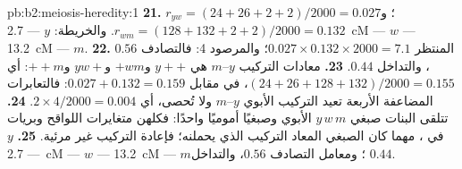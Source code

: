 \begin{solution}{pb:b2:meiosis-heredity:1}
\textbf{21.} $r_{yw} = (24 + 26 + 2 + 2)/2000 = 0.027$؛ و$r_{wm} = (128
+ 132 + 2 + 2)/2000 = 0.132$. والخريطة: $y$ --- \qty{2.7}{cM} --- $w$ ---
\qty{13.2}{cM} --- $m$.
\textbf{22.} المنتظر $0.027\times 0.132\times 2000 = 7.1$؛ والمرصود
4: فالتصادف $0.56$، والتداخل $0.44$.
\textbf{23.} معادات التركيب $y$--$m$ هي $y++$ و$+wm$ و$yw+$ و$++m$: أي $(24 +
26 + 128 + 132)/2000 = 0.155$، في مقابل $0.027 + 0.132 = 0.159$:
فالتعابرات المضاعفة الأربعة تعيد التركيب الأبوي $y$--$m$ ولا
تُحصى، أي $2\times 4/2000 = 0.004$.
\textbf{24.} تتلقى البنات صبغي $y\,w\,m$ الأبوي وصبغيًا أموميًا
واحدًا: فكلهن متغايرات اللواقح وبريات في ، مهما كان
الصبغي المعاد التركيب الذي يحملنه؛ فإعادة التركيب غير مرئية.
\textbf{25.} $y$ --- \qty{2.7}{cM} --- $w$ --- \qty{13.2}{cM} --- $m$؛
ومعامل التصادف $0.56$، والتداخل $0.44$.
\end{solution}
